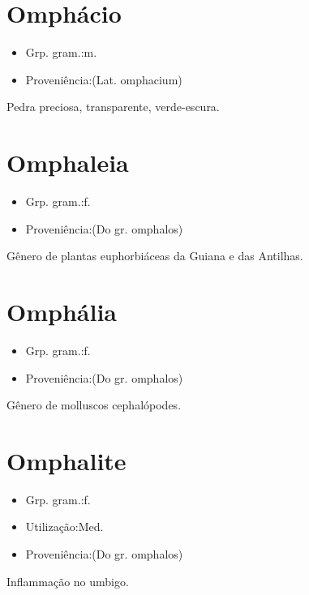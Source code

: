 \section{Omphácio}
\begin{itemize}
\item {Grp. gram.:m.}
\end{itemize}
\begin{itemize}
\item {Proveniência:(Lat. \textunderscore omphacium\textunderscore )}
\end{itemize}
Pedra preciosa, transparente, verde-escura.
\section{Omphaleia}
\begin{itemize}
\item {Grp. gram.:f.}
\end{itemize}
\begin{itemize}
\item {Proveniência:(Do gr. \textunderscore omphalos\textunderscore )}
\end{itemize}
Gênero de plantas euphorbiáceas da Guiana e das Antilhas.
\section{Omphália}
\begin{itemize}
\item {Grp. gram.:f.}
\end{itemize}
\begin{itemize}
\item {Proveniência:(Do gr. \textunderscore omphalos\textunderscore )}
\end{itemize}
Gênero de molluscos cephalópodes.
\section{Omphalite}
\begin{itemize}
\item {Grp. gram.:f.}
\end{itemize}
\begin{itemize}
\item {Utilização:Med.}
\end{itemize}
\begin{itemize}
\item {Proveniência:(Do gr. \textunderscore omphalos\textunderscore )}
\end{itemize}
Inflammação no umbigo.
